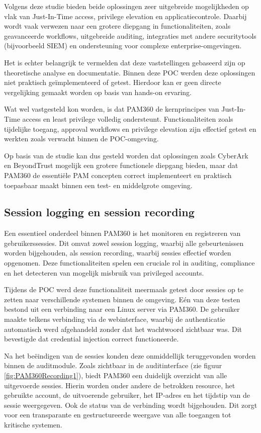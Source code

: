Volgens deze studie bieden beide oplossingen zeer uitgebreide mogelijkheden op vlak van Just-In-Time access, privilege elevation en applicatiecontrole. Daarbij wordt vaak verwezen naar een grotere diepgang in functionaliteiten, zoals geavanceerde workflows, uitgebreide auditing, integraties met andere securitytools (bijvoorbeeld SIEM) en ondersteuning voor complexe enterprise-omgevingen.

Het is echter belangrijk te vermelden dat deze vaststellingen gebaseerd zijn op theoretische analyse en documentatie. Binnen deze POC werden deze oplossingen niet praktisch geïmplementeerd of getest. Hierdoor kan er geen directe vergelijking gemaakt worden op basis van hands-on ervaring.

Wat wel vastgesteld kon worden, is dat PAM360 de kernprincipes van Just-In-Time access en least privilege volledig ondersteunt. Functionaliteiten zoals tijdelijke toegang, approval workflows en privilege elevation zijn effectief getest en werkten zoals verwacht binnen de POC-omgeving.

Op basis van de studie kan dus gesteld worden dat oplossingen zoals CyberArk en BeyondTrust mogelijk een grotere functionele diepgang bieden, maar dat PAM360 de essentiële PAM concepten correct implementeert en praktisch toepasbaar maakt binnen een test- en middelgrote omgeving.

\subsection{Session logging en session recording}
Een essentieel onderdeel binnen PAM360 is het monitoren en registreren van gebruikerssessies. Dit omvat zowel session logging, waarbij alle gebeurtenissen worden bijgehouden, als session recording, waarbij sessies effectief worden opgenomen. Deze functionaliteiten spelen een cruciale rol in auditing, compliance en het detecteren van mogelijk misbruik van privileged accounts.

Tijdens de POC werd deze functionaliteit meermaals getest door sessies op te zetten naar verschillende systemen binnen de omgeving. Eén van deze testen bestond uit een verbinding naar een Linux server via PAM360. De gebruiker maakte telkens verbinding via de webinterface, waarbij de authenticatie automatisch werd afgehandeld zonder dat het wachtwoord zichtbaar was. Dit bevestigde dat credential injection correct functioneerde.

Na het beëindigen van de sessies konden deze onmiddellijk teruggevonden worden binnen de auditmodule. Zoals zichtbaar in de auditinterface (zie figuur \ref{fig:PAM360Recording1}), biedt PAM360 een duidelijk overzicht van alle uitgevoerde sessies. Hierin worden onder andere de betrokken resource, het gebruikte account, de uitvoerende gebruiker, het IP-adres en het tijdstip van de sessie weergegeven. Ook de status van de verbinding wordt bijgehouden. Dit zorgt voor een transparante en gestructureerde weergave van alle toegangen tot kritische systemen.

